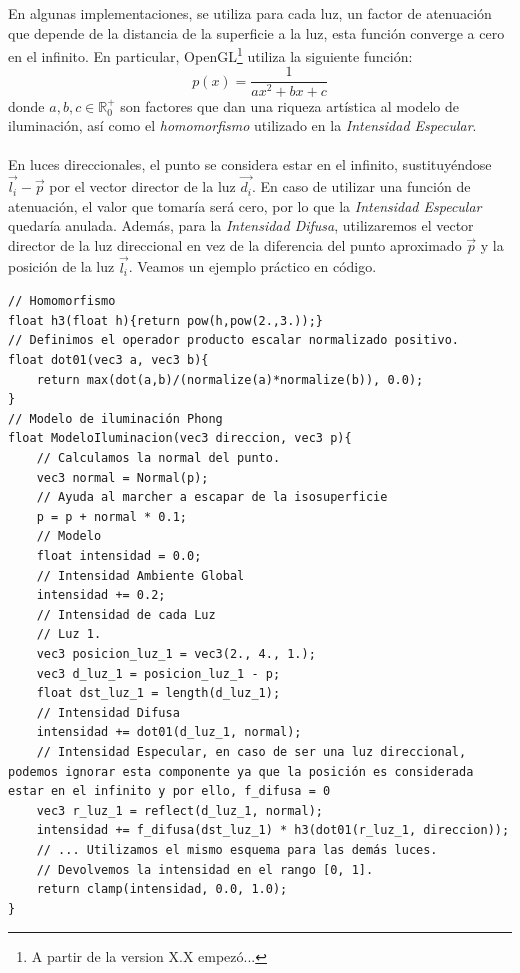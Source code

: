 En algunas implementaciones, se utiliza para cada luz, un factor de atenuación que depende de la distancia de la superficie a la luz, esta función converge a cero en el infinito. En particular, OpenGL\footnote{A partir de la version X.X empezó...} utiliza la siguiente función:
\[p(x)=\dfrac{1}{ax^2+bx+c}\]
donde \(a,b,c \in \mathbb{R}^{+}_{0}\) son factores que dan una riqueza artística al modelo de iluminación, así como el \textit{homomorfismo} utilizado en la \textit{Intensidad Especular}.\\\\En luces direccionales, el punto se considera estar en el infinito, sustituyéndose \(\Vec{l_i}-\Vec{p}\) por el vector director de la luz \(\Vec{d_i}\). En caso de utilizar una función de atenuación, el valor que tomaría  será cero, por lo que la \textit{Intensidad Especular} quedaría anulada. Además, para la \textit{Intensidad Difusa}, utilizaremos el vector director de la luz direccional en vez de la diferencia del punto aproximado \(\Vec{p}\) y la posición de la luz \(\Vec{l_i}\).
\newpage
Veamos un ejemplo práctico en código.
\begin{lstlisting}
// Homomorfismo
float h3(float h){return pow(h,pow(2.,3.));}
// Definimos el operador producto escalar normalizado positivo.
float dot01(vec3 a, vec3 b){ 
    return max(dot(a,b)/(normalize(a)*normalize(b)), 0.0);
}
// Modelo de iluminación Phong
float ModeloIluminacion(vec3 direccion, vec3 p){
    // Calculamos la normal del punto.
    vec3 normal = Normal(p);
    // Ayuda al marcher a escapar de la isosuperficie
    p = p + normal * 0.1;
    // Modelo
    float intensidad = 0.0;
    // Intensidad Ambiente Global
    intensidad += 0.2;
    // Intensidad de cada Luz
    // Luz 1.
    vec3 posicion_luz_1 = vec3(2., 4., 1.);
    vec3 d_luz_1 = posicion_luz_1 - p;
    float dst_luz_1 = length(d_luz_1);
    // Intensidad Difusa
    intensidad += dot01(d_luz_1, normal);
    // Intensidad Especular, en caso de ser una luz direccional, podemos ignorar esta componente ya que la posición es considerada estar en el infinito y por ello, f_difusa = 0
    vec3 r_luz_1 = reflect(d_luz_1, normal);
    intensidad += f_difusa(dst_luz_1) * h3(dot01(r_luz_1, direccion));
    // ... Utilizamos el mismo esquema para las demás luces.
    // Devolvemos la intensidad en el rango [0, 1].
    return clamp(intensidad, 0.0, 1.0);
}
\end{lstlisting}
\newpage

